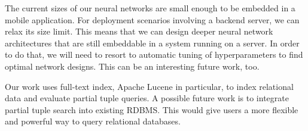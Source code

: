 The current sizes of our neural networks are small enough to be embedded in a mobile application. For deployment scenarios involving a backend server, we can relax its size limit. This means that we can design deeper neural network architectures that are still embeddable in a system running on a server. In order to do that, we will need to resort to automatic tuning of hyperparameters to find optimal network designs. This can be an interesting future work, too.

Our work uses full-text index, Apache Lucene in particular, to index relational data and evaluate partial tuple queries. A possible future work is to integrate partial tuple search into existing RDBMS. This would give users a more flexible and powerful way to query relational databases.